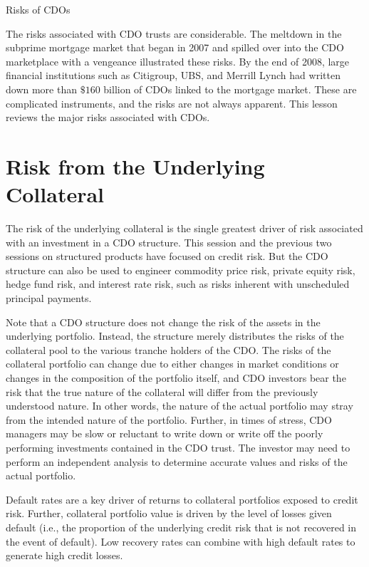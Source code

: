 \documentclass[11pt]{article}
\begin{document}
Risks of CDOs

The risks associated with CDO trusts are considerable. The meltdown in the subprime mortgage market that began in 2007 and spilled over into the CDO marketplace with a vengeance illustrated these risks. By the end of 2008, large financial institutions such as Citigroup, UBS, and Merrill Lynch had written down more than $\$ 160$ billion of CDOs linked to the mortgage market. These are complicated instruments, and the risks are not always apparent. This lesson reviews the major risks associated with CDOs.

\section*{Risk from the Underlying Collateral}
The risk of the underlying collateral is the single greatest driver of risk associated with an investment in a CDO structure. This session and the previous two sessions on structured products have focused on credit risk. But the CDO structure can also be used to engineer commodity price risk, private equity risk, hedge fund risk, and interest rate risk, such as risks inherent with unscheduled principal payments.

Note that a CDO structure does not change the risk of the assets in the underlying portfolio. Instead, the structure merely distributes the risks of the collateral pool to the various tranche holders of the CDO. The risks of the collateral portfolio can change due to either changes in market conditions or changes in the composition of the portfolio itself, and CDO investors bear the risk that the true nature of the collateral will differ from the previously understood nature. In other words, the nature of the actual portfolio may stray from the intended nature of the portfolio. Further, in times of stress, CDO managers may be slow or reluctant to write down or write off the poorly performing investments contained in the CDO trust. The investor may need to perform an independent analysis to determine accurate values and risks of the actual portfolio.

Default rates are a key driver of returns to collateral portfolios exposed to credit risk. Further, collateral portfolio value is driven by the level of losses given default (i.e., the proportion of the underlying credit risk that is not recovered in the event of default). Low recovery rates can combine with high default rates to generate high credit losses.
\end{document}
